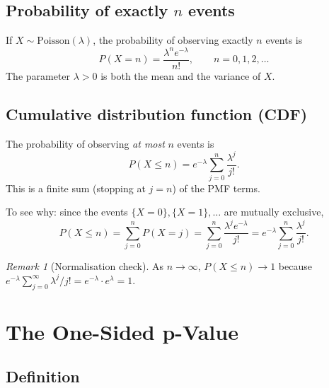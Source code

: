 \documentclass[12pt]{article}
\theoremstyle{definition}
\theoremstyle{remark}
\newtheorem{remark}{Remark}
\newcommand{\Prob}[1]{P\!\left(#1\right)}
\begin{document}
\subsection{Probability of exactly $n$ events}

If $X \sim \mathrm{Poisson}(\lambda)$, the probability of observing
exactly $n$ events is
\begin{equation}
  \Prob{X = n} = \frac{\lambda^n e^{-\lambda}}{n!}, \qquad
  n = 0, 1, 2, \ldots
  \label{eq:pmf}
\end{equation}
The parameter $\lambda > 0$ is both the mean and the variance of $X$.

\subsection{Cumulative distribution function (CDF)}

The probability of observing \emph{at most} $n$ events is
\begin{equation}
  \Prob{X \le n} = e^{-\lambda}\sum_{j=0}^{n}\frac{\lambda^j}{j!}.
  \label{eq:cdf}
\end{equation}
This is a finite sum (stopping at $j = n$) of the PMF terms.

To see why: since the events $\{X = 0\}, \{X=1\}, \ldots$ are mutually
exclusive,
\begin{equation}
  \Prob{X \le n} = \sum_{j=0}^{n} \Prob{X = j}
  = \sum_{j=0}^{n} \frac{\lambda^j e^{-\lambda}}{j!}
  = e^{-\lambda} \sum_{j=0}^{n} \frac{\lambda^j}{j!}.
  \label{eq:cdf-derived}
\end{equation}

\begin{remark}[Normalisation check]
  As $n \to \infty$, $\Prob{X \le n} \to 1$ because
  $e^{-\lambda}\sum_{j=0}^{\infty}\lambda^j/j! = e^{-\lambda} \cdot
  e^{\lambda} = 1$.
\end{remark}

\section{The One-Sided p-Value}
\label{sec:pvalue}

\subsection{Definition}
\end{document}
